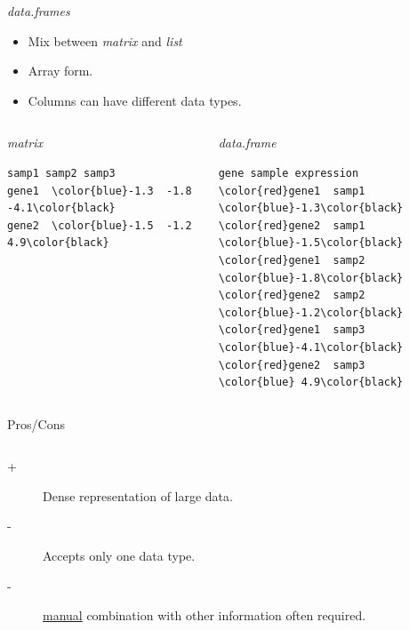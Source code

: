 \documentclass[10pt]{beamer}
\newcommand{\df}{{\it data.frame} }
\newcommand{\dfs}{{\it data.frames} }
\newcommand{\mat}{{\it matrix} }
\begin{document}
\begin{frame}[fragile, shrink=19]{\dfs}
  \begin{block}{}
    \begin{itemize}
    \item Mix between \mat and {\it list}
    \item Array form.
    \item Columns can have different data types.
    \end{itemize}
  \end{block}
  \begin{columns}
    \begin{column}{.5\textwidth}
      \begin{block}{\mat}
\begin{Verbatim}[commandchars=\\\{\}]
      samp1 samp2 samp3
gene1  \color{blue}-1.3  -1.8  -4.1\color{black}
gene2  \color{blue}-1.5  -1.2   4.9\color{black}
\end{Verbatim}
      \end{block}
    \end{column}
    \begin{column}{.5\textwidth}
      \begin{block}{\df}
\begin{Verbatim}[commandchars=\\\{\}]
 gene sample expression
\color{red}gene1  samp1       \color{blue}-1.3\color{black}
\color{red}gene2  samp1       \color{blue}-1.5\color{black}
\color{red}gene1  samp2       \color{blue}-1.8\color{black}
\color{red}gene2  samp2       \color{blue}-1.2\color{black}
\color{red}gene1  samp3       \color{blue}-4.1\color{black}
\color{red}gene2  samp3       \color{blue} 4.9\color{black}
\end{Verbatim}
      \end{block}
    \end{column}
  \end{columns}
  \begin{block}{Pros/Cons}
    \begin{columns}
      \begin{column}{.5\textwidth}
        \begin{description}
        \item[+] Dense representation of large data.
        \item[-] Accepts only one data type.
        \item[-] \underline{manual} combination with other information often required.
        \end{description}

\end{column}
\end{columns}
\end{block}
\end{frame}
\end{document}
